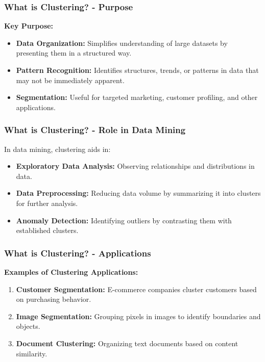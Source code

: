 \documentclass{beamer}
\begin{document}
\begin{frame}[fragile]
    \frametitle{What is Clustering? - Purpose}
    \textbf{Key Purpose:}
    \begin{itemize}
        \item \textbf{Data Organization:} Simplifies understanding of large datasets by presenting them in a structured way.
        \item \textbf{Pattern Recognition:} Identifies structures, trends, or patterns in data that may not be immediately apparent.
        \item \textbf{Segmentation:} Useful for targeted marketing, customer profiling, and other applications.
    \end{itemize}
\end{frame}

\begin{frame}[fragile]
    \frametitle{What is Clustering? - Role in Data Mining}
    In data mining, clustering aids in:
    \begin{itemize}
        \item \textbf{Exploratory Data Analysis:} Observing relationships and distributions in data.
        \item \textbf{Data Preprocessing:} Reducing data volume by summarizing it into clusters for further analysis.
        \item \textbf{Anomaly Detection:} Identifying outliers by contrasting them with established clusters.
    \end{itemize}
\end{frame}

\begin{frame}[fragile]
    \frametitle{What is Clustering? - Applications}
    \textbf{Examples of Clustering Applications:}
    \begin{enumerate}
        \item \textbf{Customer Segmentation:} E-commerce companies cluster customers based on purchasing behavior.
        \item \textbf{Image Segmentation:} Grouping pixels in images to identify boundaries and objects.
        \item \textbf{Document Clustering:} Organizing text documents based on content similarity.
    \end{enumerate}
\end{frame}
\end{document}

